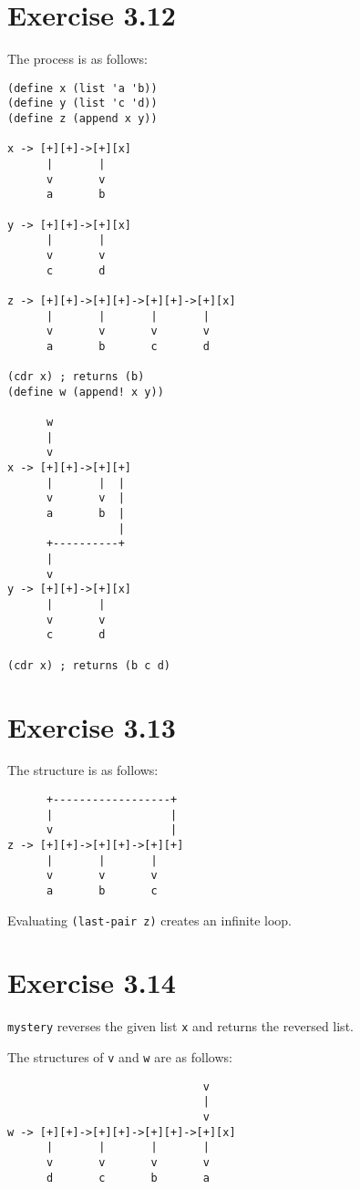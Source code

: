 \documentclass[../main.tex]{subfiles}
\begin{document}
\section{Exercise 3.12}

The process is as follows:

\begin{lstlisting}
(define x (list 'a 'b))
(define y (list 'c 'd))
(define z (append x y))

x -> [+][+]->[+][x]
      |       |
      v       v
      a       b

y -> [+][+]->[+][x]
      |       |
      v       v
      c       d

z -> [+][+]->[+][+]->[+][+]->[+][x]
      |       |       |       |
      v       v       v       v
      a       b       c       d

(cdr x) ; returns (b)
(define w (append! x y))

      w
      |
      v
x -> [+][+]->[+][+]
      |       |  |
      v       v  |
      a       b  |
                 |
      +----------+
      |
      v
y -> [+][+]->[+][x]
      |       |
      v       v
      c       d

(cdr x) ; returns (b c d)
\end{lstlisting}

\section{Exercise 3.13}

The structure is as follows:

\begin{lstlisting}
      +------------------+
      |                  |
      v                  |
z -> [+][+]->[+][+]->[+][+]
      |       |       |
      v       v       v
      a       b       c
\end{lstlisting}

Evaluating \lstinline{(last-pair z)}
 creates an infinite loop.

\section{Exercise 3.14}

\lstinline{mystery} reverses the given list
 \lstinline{x} and returns the reversed list.

The structures of \lstinline{v} and \lstinline{w}
 are as follows:

\begin{lstlisting}
                              v
                              |
                              v
w -> [+][+]->[+][+]->[+][+]->[+][x]
      |       |       |       |
      v       v       v       v
      d       c       b       a
\end{lstlisting}
\end{document}
